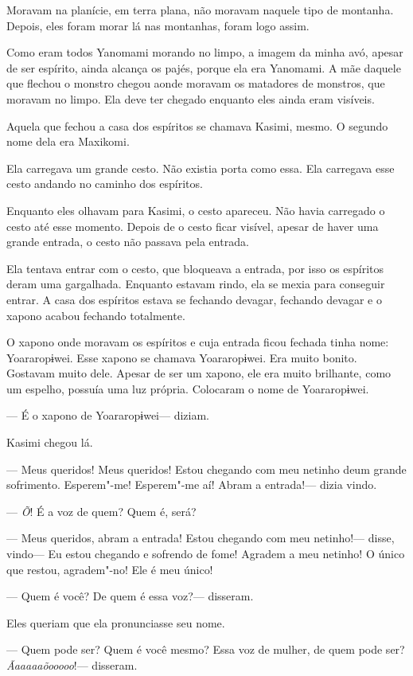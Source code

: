 Moravam na planície, em terra plana, não moravam naquele tipo de
montanha. Depois, eles foram morar lá nas montanhas, foram logo assim. 

Como eram todos Yanomami morando no limpo, a imagem da minha avó, apesar
de ser espírito, ainda alcança os pajés, porque ela era Yanomami. A mãe
daquele que flechou o monstro chegou aonde moravam os matadores de
monstros, que moravam no limpo. Ela deve ter chegado enquanto eles ainda
eram visíveis. 

Aquela que fechou a casa dos espíritos se chamava Kasimi, mesmo. O segundo nome dela era Maxikomi. 

Ela carregava um grande cesto. Não existia porta como essa. Ela
carregava esse cesto andando no caminho dos espíritos. 

Enquanto eles olhavam para Kasimi, o cesto apareceu. Não havia carregado
o cesto até esse momento. Depois de o cesto ficar visível, apesar de
haver uma grande entrada, o cesto não passava pela entrada. 

Ela tentava entrar com o cesto, que bloqueava a entrada, por isso os
espíritos deram uma gargalhada. Enquanto estavam rindo, ela se mexia
para conseguir entrar. A casa dos espíritos estava se fechando devagar,
fechando devagar e o xapono acabou fechando totalmente. 

O xapono onde moravam os espíritos e cuja entrada ficou fechada tinha
nome: Yoararopɨwei. Esse xapono se chamava Yoararopɨwei. Era muito
bonito. Gostavam muito dele. Apesar de ser um xapono, ele era muito
brilhante, como um espelho, possuía uma luz própria. Colocaram o nome de
Yoararopɨwei.

--- É o xapono de Yoararopɨwei--- diziam. 

Kasimi chegou lá. 

--- Meus queridos! Meus queridos! Estou chegando com meu netinho deum
grande sofrimento. Esperem"-me! Esperem"-me aí! Abram a entrada!--- dizia
vindo.

--- \emph{Õ}! É a voz de quem? Quem é, será?

--- Meus queridos, abram a entrada! Estou chegando com meu netinho!---
disse, vindo--- Eu estou chegando e sofrendo de fome! Agradem a meu
netinho! O único que restou, agradem"-no! Ele é meu único!

--- Quem é você? De quem é essa voz?--- disseram. 

Eles queriam que ela pronunciasse seu nome. 

--- Quem pode ser? Quem é você mesmo? Essa voz de mulher, de quem pode
ser?\emph{ Ãaaaaaõooooo}!--- disseram. 

